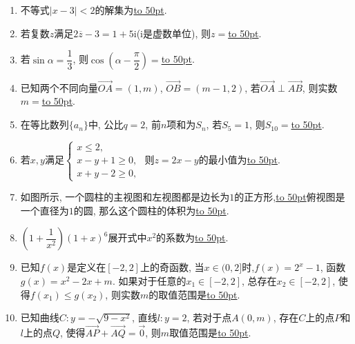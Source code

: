 \documentclass[10pt,a4paper]{article}
\newcommand{\blank}[1]{\underline{\hbox to #1pt{}}}
\begin{document}
\begin{enumerate}[1.]
\item 不等式$|x-3|<2$的解集为\blank{50}.
\item 若复数$z$满足$2 \overline z-3=1+5 \mathrm{i}$($\mathrm{i}$是虚数单位), 则$z=$\blank{50}.
\item 若$\sin\alpha =\dfrac13$, 则$\cos(\alpha -\dfrac{\pi}2)=$\blank{50}.
\item 已知两个不同向量$\overrightarrow{OA}=(1,m)$, $\overrightarrow{OB}=(m-1,2)$, 若$\overrightarrow{OA}\perp \overrightarrow{AB}$, 则实数$m=$\blank{50}.
\item 在等比数列$\{a_n\}$中, 公比$q=2$, 前$n$项和为$S_n$, 若$S_5=1$, 则$S_{10}=$\blank{50}.
\item 若$x,y$满足$\begin{cases}x\le 2, \\ x-y+1\ge 0, \\ x+y-2\ge 0,\end{cases}$ 则$z=2x-y$的最小值为\blank{50}.
\item 如图所示, 一个圆柱的主视图和左视图都是边长为$1$的正方形,\blank{50}俯视图是一个直径为$1$的圆, 那么这个圆柱的体积为\blank{50}.
\begin{center}
\end{center}
\item $(1+\dfrac1{x^2})(1+x)^6$展开式中$x^2$的系数为\blank{50}.
\item 已知$f(x)$是定义在$[-2,2]$上的奇函数, 当$x\in (0,2]$时,$f(x)=2^x-1$, 函数$g(x)=x^2-2x+m$. 如果对于任意的$x_1\in [-2,2]$, 总存在$x_2\in [-2,2]$, 使得$f(x_1)\le g(x_2)$, 则实数$m$的取值范围是\blank{50}.
\item 已知曲线$C:y=-\sqrt{9-x^2}$, 直线$l:y=2$, 若对于点$A(0,m)$, 存在$C$上的点$P$和$l$上的点$Q$, 使得$\overrightarrow{AP}+\overrightarrow{AQ}=\overrightarrow 0$, 则$m$取值范围是\blank{50}.



\end{enumerate}
\end{document}
